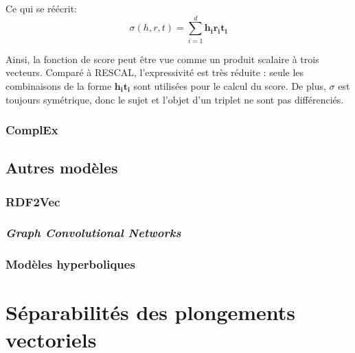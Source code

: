 Ce qui se réécrit:
\begin{equation}
    \sigma(h, r, t) = \sum_{i=1}^{d} \mathbf{h_i r_i t_i}
\end{equation}

Ainsi, la fonction de score peut être vue comme un produit scalaire à trois vecteurs. Comparé à RESCAL, l'expressivité est très réduite : seule les combinaisons de la forme $\mathbf{h_i t_i}$ sont utilisées pour le calcul du score. De plus, $\sigma$ est toujours symétrique, donc le sujet et l'objet d'un triplet ne sont pas différenciés.

\subsubsection{ComplEx}
\label{subsec:complex}


\subsection{Autres modèles}
\label{subsec:kge-models-misc}

\subsubsection{RDF2Vec}
\subsubsection{\textit{Graph Convolutional Networks}}
\subsubsection{Modèles hyperboliques}


\section{Séparabilités des plongements vectoriels}
\label{sec:kge-sep}
